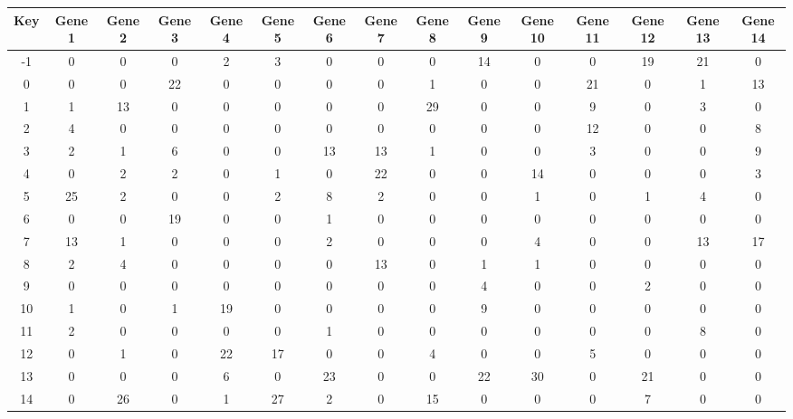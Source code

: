 \begin{tabular}{|c|c|c|c|c|c|c|c|c|c|c|c|c|c|c|}
\hline
Key & Gene 1 & Gene 2 & Gene 3 & Gene 4 & Gene 5 & Gene 6 & Gene 7 & Gene 8 & Gene 9 & Gene 10 & Gene 11 & Gene 12 & Gene 13 & Gene 14 \\
\hline
-1 & 0 & 0 & 0 & 2 & 3 & 0 & 0 & 0 & 14 & 0 & 0 & 19 & 21 & 0 \\
0 & 0 & 0 & 22 & 0 & 0 & 0 & 0 & 1 & 0 & 0 & 21 & 0 & 1 & 13 \\
1 & 1 & 13 & 0 & 0 & 0 & 0 & 0 & 29 & 0 & 0 & 9 & 0 & 3 & 0 \\
2 & 4 & 0 & 0 & 0 & 0 & 0 & 0 & 0 & 0 & 0 & 12 & 0 & 0 & 8 \\
3 & 2 & 1 & 6 & 0 & 0 & 13 & 13 & 1 & 0 & 0 & 3 & 0 & 0 & 9 \\
4 & 0 & 2 & 2 & 0 & 1 & 0 & 22 & 0 & 0 & 14 & 0 & 0 & 0 & 3 \\
5 & 25 & 2 & 0 & 0 & 2 & 8 & 2 & 0 & 0 & 1 & 0 & 1 & 4 & 0 \\
6 & 0 & 0 & 19 & 0 & 0 & 1 & 0 & 0 & 0 & 0 & 0 & 0 & 0 & 0 \\
7 & 13 & 1 & 0 & 0 & 0 & 2 & 0 & 0 & 0 & 4 & 0 & 0 & 13 & 17 \\
8 & 2 & 4 & 0 & 0 & 0 & 0 & 13 & 0 & 1 & 1 & 0 & 0 & 0 & 0 \\
9 & 0 & 0 & 0 & 0 & 0 & 0 & 0 & 0 & 4 & 0 & 0 & 2 & 0 & 0 \\
10 & 1 & 0 & 1 & 19 & 0 & 0 & 0 & 0 & 9 & 0 & 0 & 0 & 0 & 0 \\
11 & 2 & 0 & 0 & 0 & 0 & 1 & 0 & 0 & 0 & 0 & 0 & 0 & 8 & 0 \\
12 & 0 & 1 & 0 & 22 & 17 & 0 & 0 & 4 & 0 & 0 & 5 & 0 & 0 & 0 \\
13 & 0 & 0 & 0 & 6 & 0 & 23 & 0 & 0 & 22 & 30 & 0 & 21 & 0 & 0 \\
14 & 0 & 26 & 0 & 1 & 27 & 2 & 0 & 15 & 0 & 0 & 0 & 7 & 0 & 0 \\
\hline
\end{tabular}